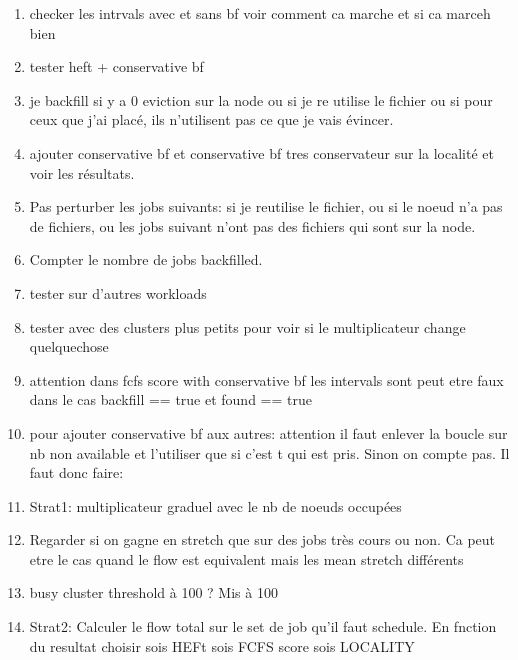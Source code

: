 \documentclass[a4paper]{article}
\begin{document}
\begin{enumerate}
			\item checker les intrvals avec et sans bf voir comment ca marche et si ca marceh bien
			\item tester heft + conservative bf
			\item je backfill si y a 0 eviction sur la node ou si je re utilise le fichier ou si pour ceux que j'ai placé, ils n'utilisent pas ce que je vais évincer.
			\item ajouter conservative bf et conservative bf tres conservateur sur la localité et voir les résultats.
				\item Pas perturber les jobs suivants: si je reutilise le fichier, ou si le noeud n'a pas de fichiers, ou les jobs suivant n'ont pas des fichiers qui sont sur la node.
			\item Compter le nombre de jobs backfilled.
			\item tester sur d'autres workloads
			\item tester avec des clusters plus petits pour voir si le multiplicateur change quelquechose
			\item attention dans fcfs score with conservative bf les intervals sont peut etre faux dans le cas backfill == true et found == true
			\item pour ajouter conservative bf aux autres: attention il faut enlever la boucle sur nb non available et l'utiliser que si c'est t qui est pris. Sinon on compte pas. Il faut donc faire:

			\item Strat1: multiplicateur graduel avec le nb de noeuds occupées
			\item Regarder si on gagne en stretch que sur des jobs très cours ou non. Ca peut etre le cas quand le flow est equivalent mais les mean stretch différents
			\item busy cluster threshold à 100 ? Mis à 100
			\item Strat2: Calculer le flow total sur le set de job qu'il faut schedule. En fnction du resultat choisir sois HEFt sois FCFS score sois LOCALITY
 			

\end{enumerate}
\end{document}
